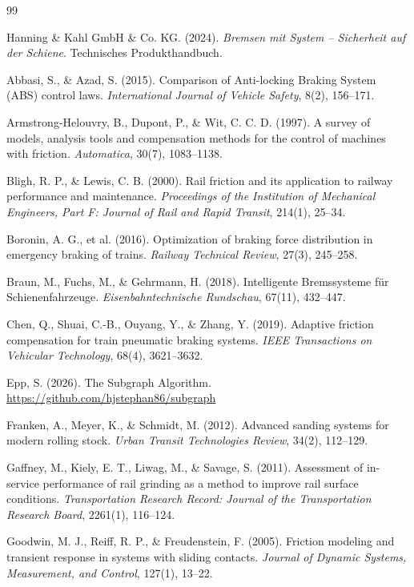 \documentclass[a4paper,12pt]{article}
\theoremstyle{definition}
\begin{document}
\begin{thebibliography}{99}

 Hanning \& Kahl GmbH \& Co. KG. (2024). \textit{Bremsen mit System -- Sicherheit auf der Schiene}. Technisches Produkthandbuch.

 Abbasi, S., \& Azad, S. (2015). Comparison of Anti-locking Braking System (ABS) control laws. \textit{International Journal of Vehicle Safety}, 8(2), 156--171.

 Armstrong-Helouvry, B., Dupont, P., \& Wit, C. C. D. (1997). A survey of models, analysis tools and compensation methods for the control of machines with friction. \textit{Automatica}, 30(7), 1083--1138.

 Bligh, R. P., \& Lewis, C. B. (2000). Rail friction and its application to railway performance and maintenance. \textit{Proceedings of the Institution of Mechanical Engineers, Part F: Journal of Rail and Rapid Transit}, 214(1), 25--34.

 Boronin, A. G., et al. (2016). Optimization of braking force distribution in emergency braking of trains. \textit{Railway Technical Review}, 27(3), 245--258.

 Braun, M., Fuchs, M., \& Gehrmann, H. (2018). Intelligente Bremssysteme für Schienenfahrzeuge. \textit{Eisenbahntechnische Rundschau}, 67(11), 432--447.

 Chen, Q., Shuai, C.-B., Ouyang, Y., \& Zhang, Y. (2019). Adaptive friction compensation for train pneumatic braking systems. \textit{IEEE Transactions on Vehicular Technology}, 68(4), 3621--3632.

 Epp, S. (2026). The Subgraph Algorithm. \url{https://github.com/hjstephan86/subgraph}

 Franken, A., Meyer, K., \& Schmidt, M. (2012). Advanced sanding systems for modern rolling stock. \textit{Urban Transit Technologies Review}, 34(2), 112--129.

 Gaffney, M., Kiely, E. T., Liwag, M., \& Savage, S. (2011). Assessment of in-service performance of rail grinding as a method to improve rail surface conditions. \textit{Transportation Research Record: Journal of the Transportation Research Board}, 2261(1), 116--124.

 Goodwin, M. J., Reiff, R. P., \& Freudenstein, F. (2005). Friction modeling and transient response in systems with sliding contacts. \textit{Journal of Dynamic Systems, Measurement, and Control}, 127(1), 13--22.


\end{thebibliography}
\end{document}
